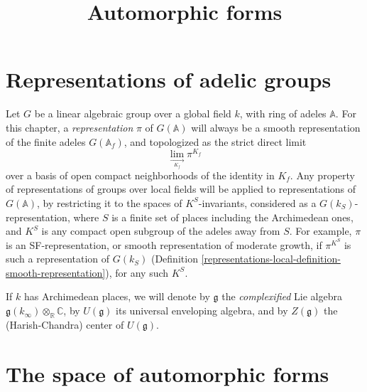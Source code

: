 

%


\title{Automorphic forms}


\maketitle

\label{section-phantom}

\tableofcontents

\section{Representations of adelic groups}
\label{section-representations-adelic}

Let $G$ be a linear algebraic group over a global field $k$, with ring of adeles $\mathbb A$. For this chapter, a \emph{representation} $\pi$ of $G(\mathbb A)$ will always be a smooth representation of the finite adeles $G(\mathbb A_f)$, and topologized as the strict direct limit 
$$\lim_{\underset{K_f}\to} \pi^{K_f}$$
over a basis of open compact neighborhoods of the identity in $K_f$. Any property of representations of groups over local fields will be applied to representations of $G(\mathbb A)$, by restricting it to the spaces of $K^S$-invariants, considered as a $G(k_S)$-representation, where $S$ is a finite set of places including the Archimedean ones, and $K^S$ is any compact open subgroup of the adeles away from $S$. For example, $\pi$ is an SF-representation, or smooth representation of moderate growth, if $\pi^{K^S}$ is such a representation of $G(k_S)$ (Definition \ref{representations-local-definition-smooth-representation}), for any such $K^S$.

If $k$ has Archimedean places, we will denote by $\mathfrak g$ the \emph{complexified} Lie algebra $\mathfrak g(k_\infty)\otimes_{\mathbb R}\mathbb C$, by $U(\mathfrak g)$ its universal enveloping algebra, and by $Z(\mathfrak g)$ the (Harish-Chandra) center of $U(\mathfrak g)$. 

\section{The space of automorphic forms}
\label{section-space-automorphic-forms}


